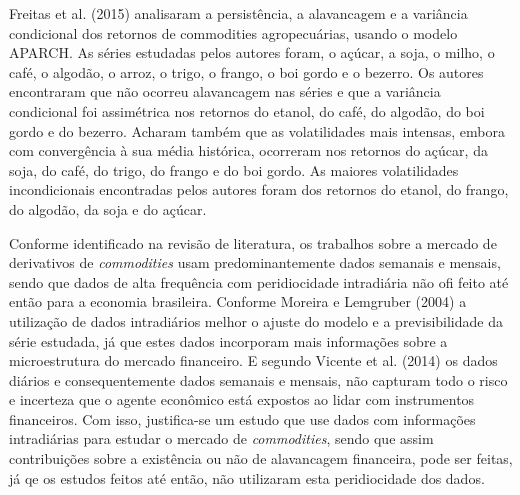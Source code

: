 \documentclass[]{article}
\begin{document}
Freitas et al. (2015) analisaram a persistência, a alavancagem e a
variância condicional dos retornos de commodities agropecuárias, usando
o modelo APARCH. As séries estudadas pelos autores foram, o açúcar, a
soja, o milho, o café, o algodão, o arroz, o trigo, o frango, o boi
gordo e o bezerro. Os autores encontraram que não ocorreu alavancagem
nas séries e que a variância condicional foi assimétrica nos retornos do
etanol, do café, do algodão, do boi gordo e do bezerro. Acharam também
que as volatilidades mais intensas, embora com convergência à sua média
histórica, ocorreram nos retornos do açúcar, da soja, do café, do trigo,
do frango e do boi gordo. As maiores volatilidades incondicionais
encontradas pelos autores foram dos retornos do etanol, do frango, do
algodão, da soja e do açúcar.

Conforme identificado na revisão de literatura, os trabalhos sobre a
mercado de derivativos de \emph{commodities} usam predominantemente
dados semanais e mensais, sendo que dados de alta frequência com
peridiocidade intradiária não ofi feito até então para a economia
brasileira. Conforme Moreira e Lemgruber (2004) a utilização de dados
intradiários melhor o ajuste do modelo e a previsibilidade da série
estudada, já que estes dados incorporam mais informações sobre a
microestrutura do mercado financeiro. E segundo Vicente et al. (2014) os
dados diários e consequentemente dados semanais e mensais, não capturam
todo o risco e incerteza que o agente econômico está expostos ao lidar
com instrumentos financeiros. Com isso, justifica-se um estudo que use
dados com informações intradiárias para estudar o mercado de
\emph{commodities}, sendo que assim contribuições sobre a existência ou
não de alavancagem financeira, pode ser feitas, já qe os estudos feitos
até então, não utilizaram esta peridiocidade dos dados.

\pagebreak
\end{document}
